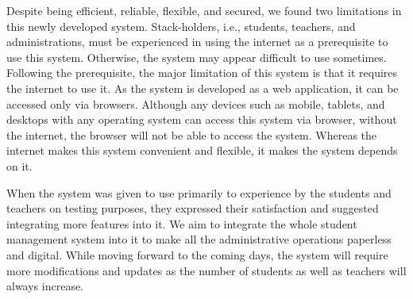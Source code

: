 Despite being efficient, reliable, flexible, and secured, we found two limitations in this newly developed system. Stack-holders, i.e., students, teachers, and administrations, must be experienced in using the internet as a prerequisite to use this system. Otherwise, the system may appear difficult to use sometimes. Following the prerequisite, the major limitation of this system is that it requires the internet to use it. As the system is developed as a web application, it can be accessed only via browsers. Although any devices such as mobile, tablets, and desktops with any operating system can access this system via browser, without the internet, the browser will not be able to access the system. Whereas the internet makes this system convenient and flexible, it makes the system depends on it. 

When the system was given to use primarily to experience by the students and teachers on testing purposes, they expressed their satisfaction and suggested integrating more features into it. We aim to integrate the whole student management system into it to make all the administrative operations paperless and digital. While moving forward to the coming days, the system will require more modifications and updates as the number of students as well as teachers will always increase. 


\clearpage